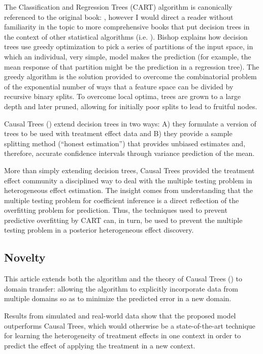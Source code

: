 \documentclass[a4paper,12pt]{article}
\begin{document}
The Classification and Regression Trees (CART) algorithm is canonically referenced to the original book:  \cite{breiman1984classification}, however I would direct a reader without familiarity in the topic to more comprehensive books that put decision trees in the context of other statistical algorithms (i.e. \cite{bishop2006pattern}). Bishop explains how decision trees use greedy optimization to pick a series of partitions of the input space, in which an individual, very simple, model makes the prediction (for example, the mean response of that partition might be the prediction in a regression tree). The greedy algorithm is the solution provided to overcome the combinatorial problem of the exponential number of ways that a feature space can be divided by recursive binary splits. To overcome local optima, trees are grown to a large depth and later pruned, allowing for initially poor splits to lead to fruitful nodes.

Causal Trees (\cite{Athey2016}) extend decision trees in two ways: A) they formulate a version of trees to be used with treatment effect data and B) they provide a sample splitting method (``honest estimation'') that provides unbiased estimates and, therefore, accurate confidence intervals through variance prediction of the mean.

More than simply extending decision trees, Causal Trees provided the treatment effect community a disciplined way to deal with the multiple testing problem in heterogeneous effect estimation. The insight comes from understanding that the multiple testing problem for coefficient inference is a direct reflection of the overfitting problem for prediction. Thus, the techniques used to prevent predictive overfitting by CART can, in turn, be used to prevent the multiple testing problem in a posterior heterogeneous effect discovery.

\subsection{ Novelty }

This article extends both the algorithm and the theory of Causal Trees (\cite{Athey2016}) to domain transfer: allowing the algorithm to explicitly incorporate data from multiple domains so as to minimize the predicted error in a new domain.

Results from simulated and real-world data show that the proposed model outperforms Causal Trees, which would otherwise be a state-of-the-art technique for learning the heterogeneity of treatment effects in one context in order to predict the effect of applying the treatment in a new context.
\end{document}
